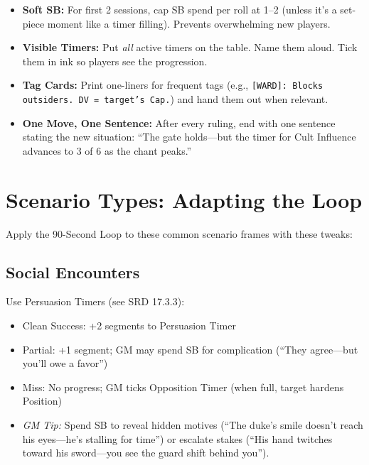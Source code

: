 \begin{tcolorbox}[colback=orange!5!white, colframe=orange!75!black, title=Rookie GM Settings,breakable]
\begin{itemize}
  \item \textbf{Soft SB:} For first 2 sessions, cap SB spend per roll at 1--2 (unless it's a set-piece moment like a timer filling). Prevents overwhelming new players.
  \item \textbf{Visible Timers:} Put \textit{all} active timers on the table. Name them aloud. Tick them in ink so players see the progression.
  \item \textbf{Tag Cards:} Print one-liners for frequent tags (e.g., \texttt{[WARD]: Blocks outsiders. DV = target's Cap.}) and hand them out when relevant.
  \item \textbf{One Move, One Sentence:} After every ruling, end with one sentence stating the new situation: ``The gate holds---but the timer for Cult Influence advances to 3 of 6 as the chant peaks.''
\end{itemize}
\end{tcolorbox}

\section{Scenario Types: Adapting the Loop}
Apply the 90-Second Loop to these common scenario frames with these tweaks:

\subsection{Social Encounters}
Use Persuasion Timers (see SRD 17.3.3):
\begin{itemize}
  \item Clean Success: +2 segments to Persuasion Timer
  \item Partial: +1 segment; GM may spend SB for complication (``They agree---but you'll owe a favor'')
  \item Miss: No progress; GM ticks Opposition Timer (when full, target hardens Position)
  \item \textit{GM Tip:} Spend SB to reveal hidden motives (``The duke's smile doesn't reach his eyes---he's stalling for time'') or escalate stakes (``His hand twitches toward his sword---you see the guard shift behind you'').
\end{itemize}

